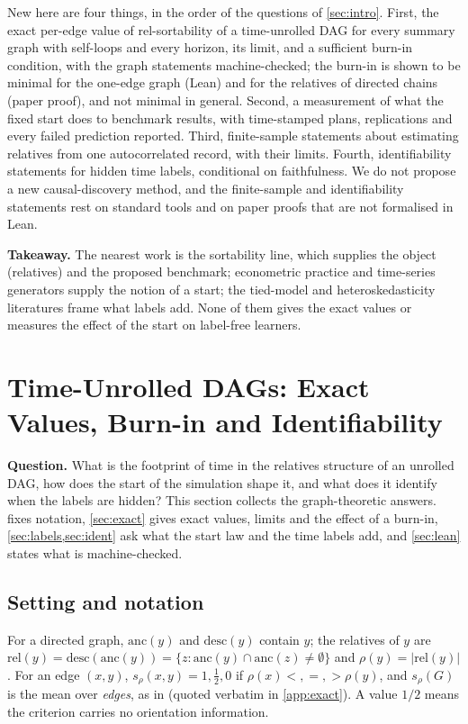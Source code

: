 \documentclass[pdflatex,sn-apa]{sn-jnl}
\theoremstyle{thmstyleone}
\theoremstyle{thmstylethree}
\theoremstyle{thmstyletwo}
\newcommand{\rel}{\mathrm{rel}}
\newcommand{\anc}{\mathrm{anc}}
\newcommand{\desc}{\mathrm{desc}}
\newcommand{\srho}{s_\rho}
\begin{document}
New here are four things, in the order of the questions of \cref{sec:intro}.
First, the exact per-edge value of rel-sortability of a time-unrolled DAG for
every summary graph with self-loops and every horizon, its limit, and a
sufficient burn-in condition, with the graph statements machine-checked; the
burn-in is shown to be minimal for the one-edge graph (Lean) and for the
relatives of directed chains (paper proof), and not minimal in general. Second, a
measurement of what the fixed start does to benchmark results, with
time-stamped plans, replications and every failed prediction reported. Third,
finite-sample statements about estimating relatives from one autocorrelated
record, with their limits. Fourth, identifiability statements for hidden time
labels, conditional on faithfulness. We do not propose a new causal-discovery
method, and the finite-sample and identifiability statements rest on standard
tools and on paper proofs that are not formalised in Lean.

\textbf{Takeaway.} The nearest work is the sortability line, which supplies
the object (relatives) and the proposed benchmark; econometric practice and
time-series generators supply the notion of a start; the tied-model and
heteroskedasticity literatures frame what labels add. None of them gives the
exact values or measures the effect of the start on label-free learners.

\section{Time-Unrolled DAGs: Exact Values, Burn-in and Identifiability}
\label{sec:theory}

\textbf{Question.} What is the footprint of time in the relatives structure of
an unrolled DAG, how does the start of the simulation shape it, and what does
it identify when the labels are hidden? This section collects the
graph-theoretic answers.  fixes notation, \cref{sec:exact}
gives exact values, limits and the effect of a burn-in,
\cref{sec:labels,sec:ident} ask what the start law and the time labels add, and
\cref{sec:lean} states what is machine-checked.

\subsection{Setting and notation}
\label{sec:setting}

For a directed graph, $\anc(y)$ and $\desc(y)$ contain $y$; the relatives of
$y$ are $\rel(y)=\desc(\anc(y))=\{z:\anc(y)\cap\anc(z)\neq\emptyset\}$ and
$\rho(y)=|\rel(y)|$. For an edge $(x,y)$, $\srho(x,y)=1,\tfrac12,0$ if
$\rho(x)<,=,>\rho(y)$, and $\srho(G)$ is the mean over \emph{edges}, as in
\citet[Eq.~(4)]{reisach2026topological} (quoted verbatim in \cref{app:exact}).
A value $1/2$ means the criterion carries no orientation information.
\end{document}
